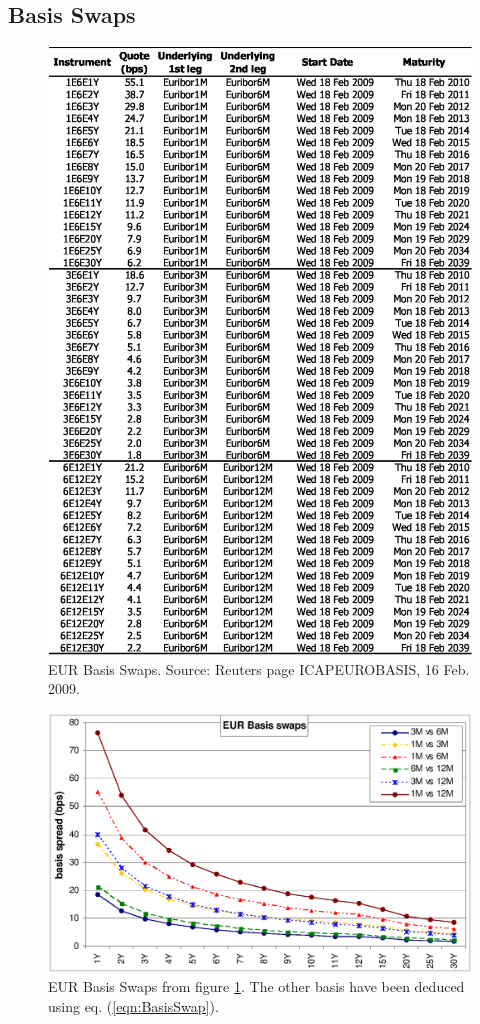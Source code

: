 \documentclass[11pt,reqno]{amsart}
\begin{document}
\subsection{Basis Swaps}
\begin{figure}[tbp]
\centering
\includegraphics[scale=0.9]{../figures/FigMktBasis}
\caption{EUR Basis Swaps. Source: Reuters page ICAPEUROBASIS, 16 Feb. 2009.}
\label{fig:BasisSwaps}
\end{figure}
\begin{figure}[tbp]
\centering
\includegraphics[scale=0.65]{../figures/FigMktBasisGraph}
\caption{EUR Basis Swaps from figure \ref{fig:BasisSwaps}. The other basis have been deduced using eq. (\ref{eqn:BasisSwap}).}
\label{fig:BasisSwapsGraph}
\end{figure}
\end{document}
